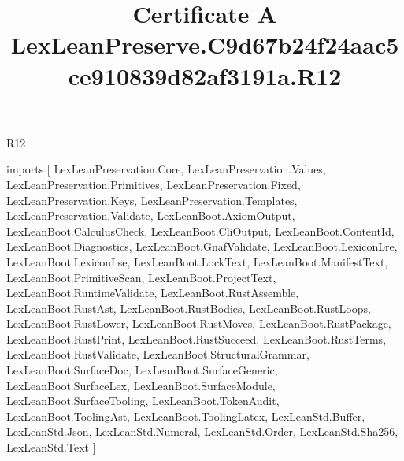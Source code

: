 \begin{lexlean}{R12}
\title{Certificate A LexLeanPreserve.C9d67b24f24aac5ce910839d82af3191a.R12}
\begin{coremodule}
imports [
  LexLeanPreservation.Core,
  LexLeanPreservation.Values,
  LexLeanPreservation.Primitives,
  LexLeanPreservation.Fixed,
  LexLeanPreservation.Keys,
  LexLeanPreservation.Templates,
  LexLeanPreservation.Validate,
  LexLeanBoot.AxiomOutput,
  LexLeanBoot.CalculusCheck,
  LexLeanBoot.CliOutput,
  LexLeanBoot.ContentId,
  LexLeanBoot.Diagnostics,
  LexLeanBoot.GnafValidate,
  LexLeanBoot.LexiconLre,
  LexLeanBoot.LexiconLse,
  LexLeanBoot.LockText,
  LexLeanBoot.ManifestText,
  LexLeanBoot.PrimitiveScan,
  LexLeanBoot.ProjectText,
  LexLeanBoot.RuntimeValidate,
  LexLeanBoot.RustAssemble,
  LexLeanBoot.RustAst,
  LexLeanBoot.RustBodies,
  LexLeanBoot.RustLoops,
  LexLeanBoot.RustLower,
  LexLeanBoot.RustMoves,
  LexLeanBoot.RustPackage,
  LexLeanBoot.RustPrint,
  LexLeanBoot.RustSucceed,
  LexLeanBoot.RustTerms,
  LexLeanBoot.RustValidate,
  LexLeanBoot.StructuralGrammar,
  LexLeanBoot.SurfaceDoc,
  LexLeanBoot.SurfaceGeneric,
  LexLeanBoot.SurfaceLex,
  LexLeanBoot.SurfaceModule,
  LexLeanBoot.SurfaceTooling,
  LexLeanBoot.TokenAudit,
  LexLeanBoot.ToolingAst,
  LexLeanBoot.ToolingLatex,
  LexLeanStd.Buffer,
  LexLeanStd.Json,
  LexLeanStd.Numeral,
  LexLeanStd.Order,
  LexLeanStd.Sha256,
  LexLeanStd.Text
]


\end{coremodule}
\end{lexlean}
